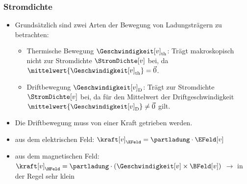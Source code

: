 \begin{frame}
  \frametitle{Stromdichte}


\begin{itemize}[<+->]
    \item Grundsätzlich sind zwei Arten der Bewegung von Ladungsträgern zu betrachten:
  \begin{itemize}[<+->]
    \item Thermische Bewegung \({\Geschwindigkeit[v]}_\mathrm{th}\): Trägt makroskopisch nicht zur Stromdichte \(\StromDichte[v]\) bei, da \(\mittelwert{\Geschwindigkeit[v]_\mathrm{th}} = \vec{0} \).
    \item Driftbewegung \({\Geschwindigkeit[v]}_\mathrm{D}\): Trägt zur Stromdichte \(\StromDichte[v] \) bei, da für den Mittelwert der Driftgeschwindigkeit \(\mittelwert{\Geschwindigkeit[v]_\mathrm{D}} \ne \vec{0} \) gilt.
\end{itemize}
\item Die Driftbewegung muss von einer Kraft getrieben werden.
\item aus dem elektrischen Feld: \(\kraft[v]_\mathrm{\EFeld} = \partladung \cdot \EFeld[v] \)
\item aus dem magnetischen Feld: \(\kraft[v]_\mathrm{\HFeld} = \partladung \cdot \left(\Geschwindigkeit[v] \times \BFeld[v]\right) \) $\to$ in der Regel sehr klein 
\end{itemize}
\end{frame}

